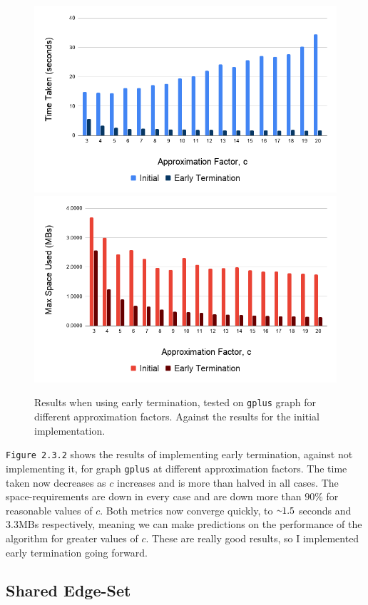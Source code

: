 \documentclass[11pt,twoside,a4paper]{report}
\begin{document}
\begin{figure}[H]
	\label{Figure 3}
	\includegraphics[width=.5\textwidth]{img/gplusEarlyTerminationTime.png}
	\includegraphics[width=.5\textwidth]{img/gplusEarlyTerminationSpace.png}
	\caption{Results when using early termination, tested on \texttt{gplus} graph for different approximation factors. Against the results for the initial implementation.}
\end{figure}

\par \texttt{Figure 2.3.2} shows the results of implementing early termination, against not implementing it, for graph \texttt{gplus} at different approximation factors. The time taken now decreases as $c$ increases and is more than halved in all cases. The space-requirements are down in every case and are down more than $90\%$ for reasonable values of $c$. Both metrics now converge quickly, to $\smallsim\!\!1.5$ seconds and $3.3$MBs respectively, meaning we can make predictions on the performance of the algorithm for greater values of $c$. These are really good results, so I implemented early termination going forward.

\subsection{Shared Edge-Set}
\end{document}
